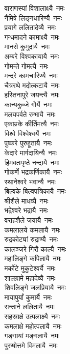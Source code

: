 \begin{multicols}{2}
\begin{flushleft}
वाराणस्यां विशालाक्ष्यै~नमः\\
नैमिषे लिङ्गधारिण्यै~नमः\\
प्रयागे ललितादेव्यै~नमः\\
गन्धमादने कामाक्ष्यै~नमः\\
मानसे कुमुदायै~नमः\\
अम्बरे विश्वकायायै~नमः\\
गोमन्ते गोमत्यै~नमः\\
मन्दरे कामचारिण्यै~नमः\\
चैत्ररथे मदोत्कटायै~नमः\\
हस्तिनापुरे जयन्त्यै~नमः\hfill{}\\
कान्यकुब्जे गौर्यै~नमः\\
मलयपर्वते रम्भायै~नमः\\
एकाम्रके कीर्तिमत्यै~नमः\\
विश्वे विश्वेश्वर्यै~नमः\\
पुष्करे पुरुहूतायै~नमः\\
केदारे मार्गदायिन्यै~नमः\\
हिमवतःपृष्ठे नन्दायै~नमः\\
गोकर्णे भद्रकर्णिकायै~नमः\\
स्थानेश्वरे भवान्यै~नमः\\
बिल्वके बिल्वपत्रिकायै~नमः\hfill{}\\
श्रीशैले माधव्यै~नमः\\
भद्रेश्वरे भद्रायै~नमः\\
वराहशैले जयायै~नमः\\
कमलालये कमलायै~नमः\\
रुद्रकोट्यां रुद्राण्यै~नमः\\
कालञ्जरे गिरौ काल्यै~नमः\\
महालिङ्गे कपिलायै~नमः\\
मर्कोटे मुकुटेश्वर्यै~नमः\\
शालग्रामे महादेव्यै~नमः\\
शिवलिङ्गे जलप्रियायै~नमः\hfill{}\\
मायापुर्यां कुमार्यै~नमः\\
सन्ताने ललितायै~नमः\\
सहस्राक्षे उत्पलाक्ष्यै~नमः\\
कमलाक्षे महोत्पलायै~नमः\\
गङ्गायां मङ्गलायै~नमः\\
पुरुषोत्तमे विमलायै~नमः\\

\end{flushleft}
\end{multicols}
